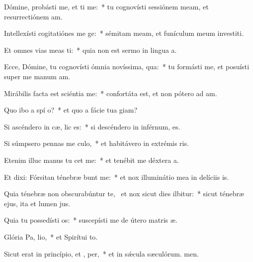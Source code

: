 \item Dómine, probásti me, et ti me:~* tu cognovísti sessiónem meam, et resurrectiónem am.
\item Intellexísti cogitatiónes me  ge:~* sémitam meam, et funículum meum investiti.
\item Et omnes vias meas ti:~* quia non est sermo in lingua a.
\item Ecce, Dómine, tu cognovísti ómnia novíssima,  qua:~* tu formásti me, et posuísti super me manum am.
\item Mirábilis facta est sciéntia   me:~* confortáta est, et non pótero ad am.
\item Quo ibo a spí o?~* et quo a fácie tua giam?
\item Si ascéndero in cæ,  lic es:~* si descéndero in inférnum, es.
\item Si súmpsero pennas me culo,~* et habitávero in extrémis ris.
\item Etenim illuc manus tu cet me:~* et tenébit me déxtera a.
\item Et dixi: Fórsitan ténebræ bunt me:~* et nox illuminátio mea in delíciis is.
\item Quia ténebræ non obscurabúntur  te,~\pscross{} et nox sicut dies ilbitur:~* sicut ténebræ ejus, ita et lumen jus.
\item Quia tu possedísti  os:~* suscepísti me de útero matris æ.
\item Glória Pa,  lio,~* et Spirítui to.
\item Sicut erat in princípio, et ,  per,~* et in sǽcula sæculórum. men.
